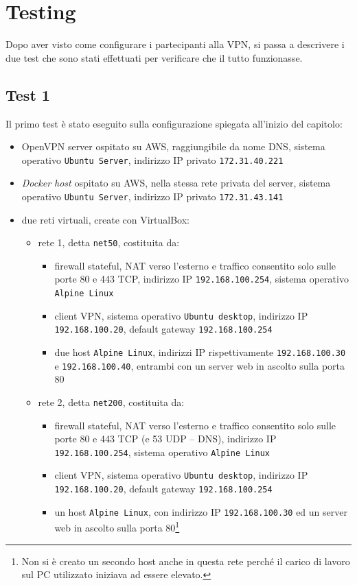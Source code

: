 \section{Testing}
Dopo aver visto come configurare i partecipanti alla VPN, si passa a descrivere
i due test che sono stati effettuati per verificare che il tutto funzionasse.

\subsection{Test 1}
Il primo test è stato eseguito sulla configurazione spiegata all'inizio del capitolo:
\begin{itemize}
  \item OpenVPN server ospitato su AWS, raggiungibile da nome DNS, sistema
  operativo \texttt{Ubuntu Server}, indirizzo IP privato \texttt{172.31.40.221}
  \item \textit{Docker host} ospitato su AWS, nella stessa rete privata del
  server, sistema
  operativo \texttt{Ubuntu Server}, indirizzo IP privato \texttt{172.31.43.141}
  \item due reti virtuali, create con VirtualBox:
  \begin{itemize}
    \item rete 1, detta \texttt{net50}, costituita da:
    \begin{itemize}
      \item firewall stateful, NAT verso l'esterno e traffico consentito solo
      sulle porte 80 e 443 TCP, indirizzo IP \texttt{192.168.100.254},
      sistema operativo \texttt{Alpine Linux}
      \item client VPN, sistema operativo \texttt{Ubuntu desktop}, indirizzo
      IP \texttt{192.168.100.20}, default gateway \texttt{192.168.100.254}
      \item due host \texttt{Alpine Linux}, indirizzi IP rispettivamente
      \texttt{192.168.100.30} e \texttt{192.168.100.40}, entrambi con un server
      web in ascolto sulla porta 80
    \end{itemize}
    \item rete 2, detta \texttt{net200}, costituita da:
    \begin{itemize}
      \item firewall stateful, NAT verso l'esterno e traffico consentito solo
      sulle porte 80 e 443 TCP (e 53 UDP -- DNS), indirizzo IP
      \texttt{192.168.100.254},
      sistema operativo \texttt{Alpine Linux}
      \item client VPN, sistema operativo \texttt{Ubuntu desktop}, indirizzo
      IP \texttt{192.168.100.20}, default gateway \texttt{192.168.100.254}
      \item un host \texttt{Alpine Linux}, con indirizzo IP
      \texttt{192.168.100.30} ed un server
      web in ascolto sulla porta 80\footnote{Non si è creato un secondo host anche
      in questa rete perché il carico di lavoro sul PC utilizzato iniziava ad
      essere elevato.}
    \end{itemize}
  \end{itemize}
\end{itemize}
